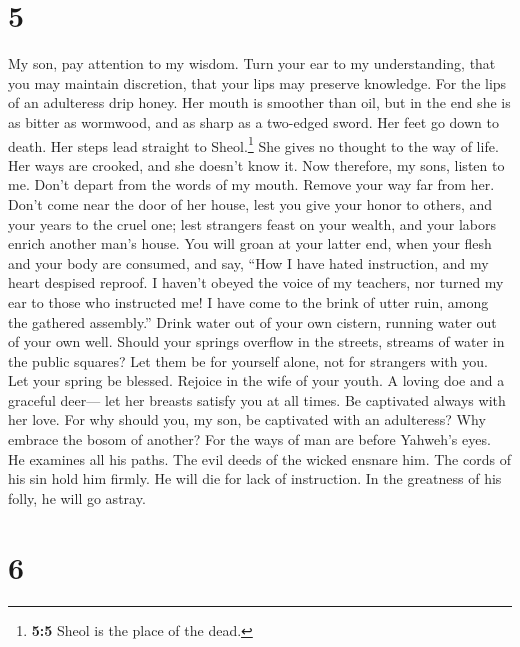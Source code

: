 \hypertarget{section-4}{%
\section{5}\label{section-4}}

 My son, pay attention to my wisdom. Turn your ear to my
understanding,  that you may maintain discretion, that
your lips may preserve knowledge.  For the lips of an
adulteress drip honey. Her mouth is smoother than oil, 
but in the end she is as bitter as wormwood, and as sharp as a two-edged
sword.  Her feet go down to death. Her steps lead straight
to Sheol.\footnote{\textbf{5:5} Sheol is the place of the dead.}
 She gives no thought to the way of life. Her ways are
crooked, and she doesn't know it.  Now therefore, my sons,
listen to me. Don't depart from the words of my mouth. 
Remove your way far from her. Don't come near the door of her house,
 lest you give your honor to others, and your years to the
cruel one;  lest strangers feast on your wealth, and your
labors enrich another man's house.  You will groan at
your latter end, when your flesh and your body are consumed,
 and say, ``How I have hated instruction, and my heart
despised reproof.  I haven't obeyed the voice of my
teachers, nor turned my ear to those who instructed me! 
I have come to the brink of utter ruin, among the gathered assembly.''
 Drink water out of your own cistern, running water out
of your own well.  Should your springs overflow in the
streets, streams of water in the public squares?  Let
them be for yourself alone, not for strangers with you. 
Let your spring be blessed. Rejoice in the wife of your youth.
 A loving doe and a graceful deer--- let her breasts
satisfy you at all times. Be captivated always with her love.
 For why should you, my son, be captivated with an
adulteress? Why embrace the bosom of another?  For the
ways of man are before Yahweh's eyes. He examines all his paths.
 The evil deeds of the wicked ensnare him. The cords of
his sin hold him firmly.  He will die for lack of
instruction. In the greatness of his folly, he will go astray.

\hypertarget{section-5}{%
\section{6}\label{section-5}}

